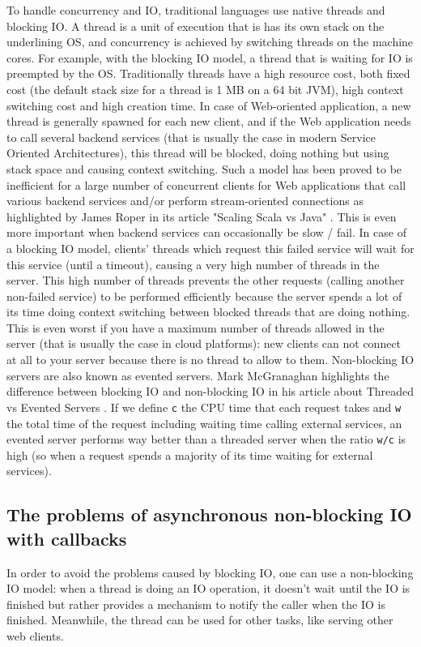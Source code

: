 To handle concurrency and IO, traditional languages use native threads and blocking IO. A thread is a unit of execution that is has its own stack
on the underlining OS, and concurrency is achieved by switching threads on the machine cores. For example, with the blocking IO model,
a thread that is waiting for IO is preempted by the OS. Traditionally threads have a high resource cost, both fixed cost (the default stack size for a thread is 
1 MB on a 64 bit JVM), high context switching cost and high creation time. In case of Web-oriented application, a new thread is generally spawned for each new client,
and if the Web application needs to call several backend services (that is usually the case in modern Service Oriented Architectures), 
this thread will be blocked, doing nothing but using stack space and causing context switching.
Such a model has been proved to be inefficient for a large number of concurrent clients for Web applications that call various backend services
and/or perform stream-oriented connections as highlighted by James Roper in its article "Scaling Scala vs Java" . This is even more
important when backend services can occasionally be slow / fail. In case of a blocking IO model, clients' threads which request
this failed service will wait for this service (until a timeout), causing a very high number of threads in the server. This high number of threads prevents the other requests (calling another non-failed service) to be performed efficiently because the server spends a lot of its time doing context switching between blocked threads that are doing nothing. This is even worst if
you have a maximum number of threads allowed in the server (that is usually the case in cloud platforms): new clients can not connect at all
to your server because there is no thread to allow to them. Non-blocking IO servers are also known as evented servers.
Mark McGranaghan highlights the difference between blocking IO and non-blocking IO in his article about Threaded vs Evented Servers . If we define \verb|c| the CPU time
that each request takes and \verb|w| the total time of the request including waiting time calling external services, an evented server
performs way better than a threaded server when the ratio \verb|w/c| is high (so when a request spends a majority of its time waiting for
external services).

\subsection{The problems of asynchronous non-blocking IO with callbacks}
In order to avoid the problems caused by blocking IO, one can use a non-blocking IO model: when a thread is doing an IO operation, it doesn't wait
until the IO is finished but rather provides a mechanism to notify the caller when the IO is finished. Meanwhile, the thread can be used for other tasks, like
serving other web clients. 

